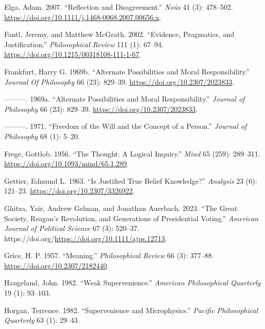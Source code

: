 \documentclass[
  12pt,
  letterpaper,
  DIV=11,
  numbers=noendperiod]{scrartcl}
\newlength{\cslhangindent}
\newenvironment{CSLReferences}[2] %
 {\begin{list}{}{%
  \setlength{\itemindent}{0pt}
  \setlength{\leftmargin}{0pt}
  \setlength{\parsep}{0pt}
  \ifodd #1
   \setlength{\leftmargin}{\cslhangindent}
   \setlength{\itemindent}{-1\cslhangindent}
  \fi
  \setlength{\itemsep}{#2\baselineskip}}}
 {\end{list}}
\begin{document}
\begin{CSLReferences}{1}{0}
Elga, Adam. 2007. {``Reflection and Disagreement.''} \emph{Noûs} 41 (3):
478--502. \url{https://doi.org/10.1111/j.1468-0068.2007.00656.x}.

Fantl, Jeremy, and Matthew McGrath. 2002. {``Evidence, Pragmatics, and
Justification.''} \emph{Philosophical Review} 111 (1): 67--94.
\url{https://doi.org/10.1215/00318108-111-1-67}.

Frankfurt, Harry G. 1969b. {``Alternate Possibilities and Moral
Responsibility.''} \emph{Journal Of Philosophy} 66 (23): 829--39.
\url{https://doi.org/10.2307/2023833}.

---------. 1969a. {``Alternate Possibilities and Moral
Responsibility.''} \emph{Journal of Philosophy} 66 (23): 829--39.
\url{https://doi.org/10.2307/2023833}.

---------. 1971. {``Freedom of the Will and the Concept of a Person.''}
\emph{Journal of Philosophy} 68 (1): 5--20.

Frege, Gottlob. 1956. {``The Thought: A Logical Inquiry.''} \emph{Mind}
65 (259): 289--311. \url{https://doi.org/10.1093/mind/65.1.289}.

Gettier, Edmund L. 1963. {``Is Justified True Belief Knowledge?''}
\emph{Analysis} 23 (6): 121--23. \url{https://doi.org/10.2307/3326922}.

Ghitza, Yair, Andrew Gelman, and Jonathan Auerbach. 2023. {``The Great
Society, Reagan's Revolution, and Generations of Presidential Voting.''}
\emph{American Journal of Political Science} 67 (3): 520--37.
https://doi.org/\url{https://doi.org/10.1111/ajps.12713}.

Grice, H. P. 1957. {``Meaning.''} \emph{Philosophical Review} 66 (3):
377--88. \url{https://doi.org/10.2307/2182440}.

Haugeland, John. 1982. {``Weak Supervenience.''} \emph{American
Philosophical Quarterly} 19 (1): 93--103.

Horgan, Terrence. 1982. {``Supervenience and Microphysics.''}
\emph{Pacific Philosophical Quarterly} 63 (1): 29--43.


\end{CSLReferences}
\end{document}
